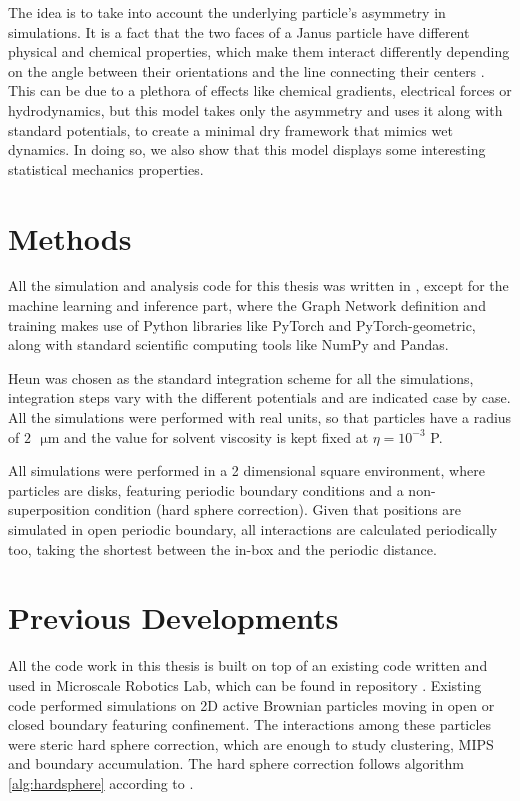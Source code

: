 \documentclass[../../master_thesis_np.tex]{subfiles}
\begin{document}
	The idea is to take into account the underlying particle's asymmetry in simulations. It is a fact that the two faces of a Janus particle have different physical and chemical properties, which make them interact differently depending on the angle between their orientations and the line connecting their centers \cite{singh_pair_2024}. This can be due to a plethora of effects like chemical gradients, electrical forces or hydrodynamics, but this model takes only the asymmetry and uses it along with standard potentials, to create a minimal dry framework that mimics wet dynamics. In doing so, we also show that this model displays some interesting statistical mechanics properties.
	
	\section{Methods}
	All the simulation and analysis code for this thesis was written in \julia, except for the machine learning and inference part, where the Graph Network definition and training makes use of Python libraries like PyTorch and PyTorch-geometric, along with standard scientific computing tools like NumPy and Pandas.
	
	Heun was chosen as the standard integration scheme for all the simulations, integration steps vary with the different potentials and are indicated case by case. All the simulations were performed with real units, so that particles have a radius of $2\text{ }\mathrm{\mu m}$ and the value for solvent viscosity is kept fixed at $\eta = 10^{-3}$ P.
	
	All simulations were performed in a 2 dimensional square environment, where particles are disks, featuring periodic boundary conditions and a non-superposition condition (hard sphere correction). Given that positions are simulated in open periodic boundary, all interactions are calculated periodically too, taking the shortest between the in-box and the periodic distance.
	
	\section{Previous Developments}
	All the code work in this thesis is built on top of an existing code written and used in Microscale Robotics Lab, which can be found in repository \cite{sharma_simulations_2023}. Existing code performed simulations on 2D active Brownian particles moving in open or closed boundary featuring confinement. The interactions among these particles were steric hard sphere correction, which are enough to study clustering, MIPS and boundary accumulation. The hard sphere correction follows algorithm \ref{alg:hardsphere} according to \cite{callegari_numerical_2019}.
\end{document}
